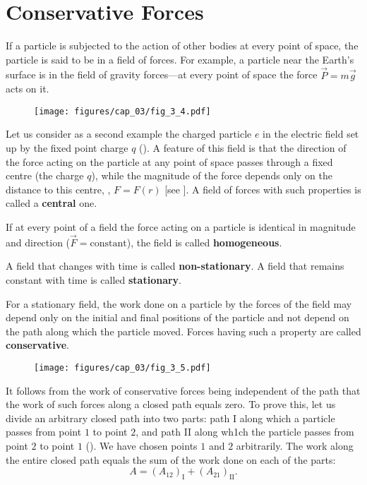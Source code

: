 \section{Conservative Forces}\label{sec:3_4}

If a particle is subjected to the action of other bodies at every point of space, the particle is said to be in a field of forces. For example, a particle near the Earth's surface is in the field of gravity forces---at every point of space the force $\vec{P}=m\vec{g}$ acts on it.

\begin{figure}[t]
	\begin{center}
		\texttt{[image: figures/cap\_03/fig\_3\_4.pdf]}
		\caption[]{}
		\label{fig:3_4}
	\end{center}
	\vspace{-0.7cm}
\end{figure}

Let us consider as a second example the charged particle $e$ in the electric field set up by the fixed point charge $q$ (). A feature of this field is that the direction of the force acting on the particle at any point of space passes through a fixed centre (the charge $q$), while the magnitude of the force depends only on the distance to this centre, \ie, $F=F(r)$ [see ]. A field of forces with such properties is called a \textbf{central} one.

If at every point of a field the force acting on a particle is identical in magnitude and direction ($\vec{F}=\text{constant}$), the field is called \textbf{homogeneous}.

A field that changes with time is called \textbf{non-stationary}. A field that remains constant with time is called \textbf{stationary}.

For a stationary field, the work done on a particle by the forces of the field may depend only on the initial and final positions of the particle and not depend on the path along which the particle moved. Forces having such a property are called \textbf{conservative}.

\begin{figure}[t]
	\begin{center}
		\texttt{[image: figures/cap\_03/fig\_3\_5.pdf]}
		\caption[]{}
		\label{fig:3_5}
	\end{center}
\vspace{-0.7cm}
\end{figure}

It follows from the work of conservative forces being independent of the path that the work of such forces along a closed path equals zero. To prove this, let us divide an arbitrary closed path into two parts: path I along which a particle passes from point $1$ to point $2$, and path II along wh1ch the particle passes from point $2$ to point $1$ (). We have chosen points $1$ and $2$ arbitrarily. The work along the entire closed path equals the sum of the work done on each of the parts:
\begin{equation}\label{eq:3_22}
A = (A_{12})_{\text{I}} + (A_{21})_{\text{II}}.
\end{equation}

